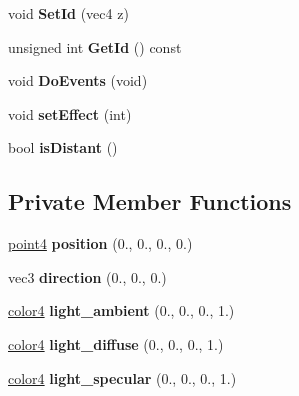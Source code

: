 \begin{DoxyCompactItemize}
\item 
\hypertarget{class_light_source_a0d8ad53dacd8e2ac34aa2fbce69f5de1}{void {\bfseries \-Set\-Id} (vec4 z)}\label{class_light_source_a0d8ad53dacd8e2ac34aa2fbce69f5de1}

\item 
\hypertarget{class_light_source_a6550cce41793d199f9eb61196d85afaa}{unsigned int {\bfseries \-Get\-Id} () const }\label{class_light_source_a6550cce41793d199f9eb61196d85afaa}

\item 
\hypertarget{class_light_source_a8b565d411a56940055ec3f07a401a856}{void {\bfseries \-Do\-Events} (void)}\label{class_light_source_a8b565d411a56940055ec3f07a401a856}

\item 
\hypertarget{class_light_source_a06c1f646e7d2ca223ab3627c1f713964}{void {\bfseries set\-Effect} (int)}\label{class_light_source_a06c1f646e7d2ca223ab3627c1f713964}

\item 
\hypertarget{class_light_source_a92e30783c70ada9adc44bb4de4d97cac}{bool {\bfseries is\-Distant} ()}\label{class_light_source_a92e30783c70ada9adc44bb4de4d97cac}

\end{DoxyCompactItemize}
\subsection*{\-Private \-Member \-Functions}
\begin{DoxyCompactItemize}
\item 
\hypertarget{class_light_source_a5a3061b9a67e38d53d0622619dded8a8}{\hyperlink{struct_angel_1_1vec4}{point4} {\bfseries position} (0., 0., 0., 0.)}\label{class_light_source_a5a3061b9a67e38d53d0622619dded8a8}

\item 
\hypertarget{class_light_source_ad5cab1330e90020c38721a71c75c1752}{vec3 {\bfseries direction} (0., 0., 0.)}\label{class_light_source_ad5cab1330e90020c38721a71c75c1752}

\item 
\hypertarget{class_light_source_ad65704b2f5a52df86844ebef4b1cf58f}{\hyperlink{struct_angel_1_1vec4}{color4} {\bfseries light\-\_\-ambient} (0., 0., 0., 1.)}\label{class_light_source_ad65704b2f5a52df86844ebef4b1cf58f}

\item 
\hypertarget{class_light_source_a12eba5ce9b94a0ef5062b21382317871}{\hyperlink{struct_angel_1_1vec4}{color4} {\bfseries light\-\_\-diffuse} (0., 0., 0., 1.)}\label{class_light_source_a12eba5ce9b94a0ef5062b21382317871}

\item 
\hypertarget{class_light_source_a7fffcad63f4e3cb143ef2f02d1d9178c}{\hyperlink{struct_angel_1_1vec4}{color4} {\bfseries light\-\_\-specular} (0., 0., 0., 1.)}\label{class_light_source_a7fffcad63f4e3cb143ef2f02d1d9178c}

\end{DoxyCompactItemize}
